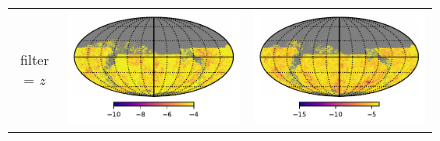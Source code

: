 \documentclass[preprintm,linenumbers]{aastex631}
\begin{document}
\begin{figure}
\begin{tabular}{@{}c@{}c@{}c@{}}
				
				filter = $z$ & \includegraphics[align=t]{results/skymaps/skymaps_delta_first_year_one_snap_v4_0_10yrs_db_noDD_noTwi_CountMetric_doAllTemplateMetrics_reduceCount_z_7_noDD_noTwi} &			
				\includegraphics[align=t]{results/skymaps/skymaps_delta_first_year_one_snap_v4_0_10yrs_db_noDD_noTwi_CountMetric_doAllTemplateMetrics_reduceCount_z_28_noDD_noTwi} \\
				

\end{tabular}
\end{figure}
\end{document}
